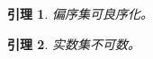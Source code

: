 \newtheorem{lemma}{引理}[chapter]%
\begin{lemma} 偏序集可良序化。 \end{lemma}
\begin{lemma} 实数集不可数。   \end{lemma}

